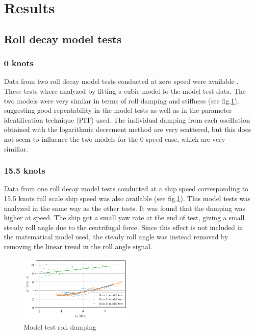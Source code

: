 \section{Results}\label{results}

    \subsection{Roll decay model tests}\label{roll-decay-model-tests}

\subsubsection{0 knots}\label{knots}

Data from two roll decay model tests conducted at zero speed were
available
.
These tests where analyzed by fitting a cubic model
to the model test data. The two models were very similar in terms of
roll damping and stiffness (see fig.\ref{fig:mdl}), suggesting
good repeatability in the model tests as well as in the parameter
identification technique (PIT) used. The individual damping from each
oscillation obtained with the logarithmic decrement method are very
scattered, but this does not seem to influence the two models for the 0
speed case, which are very similiar.

    \subsubsection{15.5 knots}\label{knots}

Data from one roll decay model tests conducted at a ship speed
corresponding to 15.5 knots full scale ship speed was also available
(see fig.\ref{fig:mdl}). This model tests was analyzed in the
same way as the other tests. It was found that the damping was higher at
speed. The ship got a small yaw rate
 at the end of test, giving a small steady roll angle due to the
centrifugal force. Since this effect is not included in the matematical
model used, the steady roll angle was instead removed by removing the
linear trend in the roll angle signal.

    

    \begin{figure}[H]
        \begin{center}\includegraphics[width = 0.5\textwidth]{figures/mdl.pdf}\end{center}
        \vspace{-1cm}
        \caption{Model test roll damping}
        \label{fig:mdl}
    \end{figure}
    
